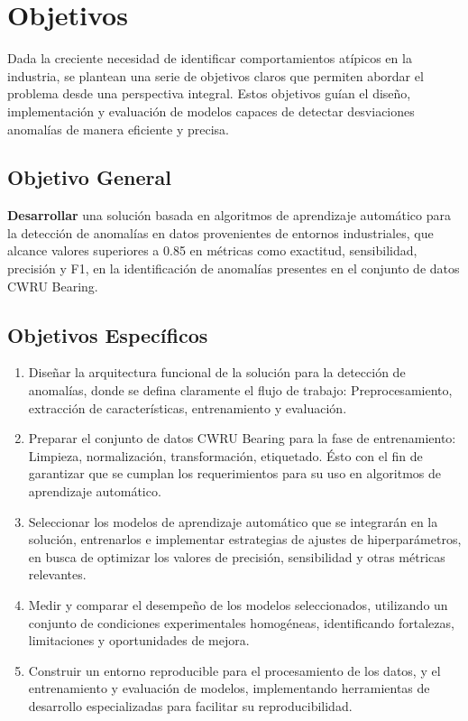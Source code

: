 \documentclass[11pt,a4paper,spanish]{book}
\numberwithin{equation}{chapter}
\numberwithin{figure}{chapter}
\begin{document}
\chapter{Objetivos}

Dada la creciente necesidad de identificar comportamientos atípicos en la industria, 
se plantean una serie de objetivos claros que permiten abordar el problema desde una 
perspectiva integral. 
Estos objetivos guían el diseño, implementación y evaluación de modelos capaces de 
detectar desviaciones anomalías de manera eficiente y precisa.


\section{Objetivo General}

\textbf{Desarrollar} una solución basada en algoritmos de aprendizaje automático para 
la detección de anomalías en datos provenientes de entornos industriales, 
que alcance valores superiores a 0.85 en métricas como exactitud, sensibilidad, 
precisión y F1, en la identificación de anomalías presentes en el conjunto de datos 
CWRU Bearing.

\section{Objetivos Específicos}

\begin{enumerate}

\item Diseñar la arquitectura funcional de la solución para la detección de anomalías, 
donde se defina claramente el flujo de trabajo: Preprocesamiento, 
extracción de características, entrenamiento y evaluación.


\item Preparar el conjunto de datos CWRU Bearing para la fase de entrenamiento: 
Limpieza, normalización, transformación, etiquetado. Ésto con el fin de garantizar que 
se cumplan los requerimientos para su uso en algoritmos de aprendizaje automático.  


\item Seleccionar los modelos de aprendizaje automático que se integrarán en la 
solución, entrenarlos e implementar estrategias de ajustes de hiperparámetros, 
en busca de optimizar los valores de precisión, sensibilidad y otras métricas 
relevantes.


\item Medir y comparar el desempeño de los modelos seleccionados, utilizando un 
conjunto de condiciones experimentales homogéneas, identificando fortalezas, 
limitaciones y oportunidades de mejora.


\item Construir un entorno reproducible para el procesamiento de los datos, 
y el entrenamiento y evaluación de modelos, implementando herramientas de desarrollo 
especializadas para facilitar su reproducibilidad.

\end{enumerate}
\end{document}
